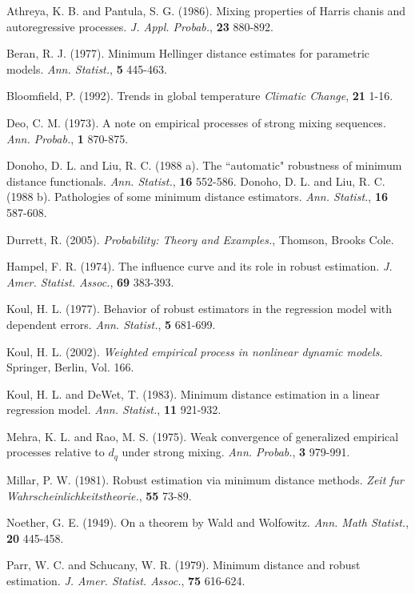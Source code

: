 \begin{thebibliography}{17}

\bibitem{} Athreya, K. B. and Pantula, S. G. (1986). Mixing properties of Harris chanis and autoregressive processes. \textit{J. Appl. Probab.}, \textbf{23} 880-892.

\bibitem{}  Beran, R. J. (1977). Minimum Hellinger distance estimates for parametric models. \textit{Ann. Statist.}, \textbf{5} 445-463.

\bibitem{}  Bloomfield, P. (1992). Trends in global temperature \textit{Climatic Change}, \textbf{21} 1-16.


\bibitem{} Deo, C. M. (1973). A note on empirical processes of strong mixing sequences. \textit{Ann. Probab.}, \textbf{1} 870-875.

\bibitem{} Donoho, D. L. and Liu, R. C. (1988 a). The ``automatic" robustness of minimum distance functionals. \textit{Ann. Statist.}, \textbf{16} 552-586.
\bibitem{} Donoho, D. L. and Liu, R. C. (1988 b). Pathologies of some minimum distance estimators. \textit{Ann. Statist.}, \textbf{16} 587-608.

\bibitem{} Durrett, R. (2005). \textit{Probability: Theory and Examples.}, Thomson, Brooks Cole.


\bibitem{} Hampel, F. R. (1974). The influence curve and its role in robust estimation. \textit{J. Amer. Statist. Assoc.}, \textbf{69} 383-393.


\bibitem{} Koul, H. L. (1977). Behavior of robust estimators in the regression model with dependent errors. \textit{Ann. Statist.}, \textbf{5} 681-699.

\bibitem{} Koul, H. L. (2002). \textit{Weighted empirical process in nonlinear dynamic models.} Springer, Berlin, Vol. 166.


\bibitem{} Koul, H. L. and DeWet, T. (1983). Minimum distance estimation in a linear regression model. \textit{Ann. Statist.}, \textbf{11} 921-932.

\bibitem{} Mehra, K. L. and Rao, M. S. (1975). Weak convergence of generalized empirical processes relative to $d_{q}$ under strong mixing. \textit{Ann. Probab.}, \textbf{3} 979-991.

\bibitem{} Millar, P. W. (1981). Robust estimation via minimum distance methods. \textit{Zeit fur Wahrscheinlichkeitstheorie.}, \textbf{55} 73-89.

\bibitem{} Noether, G. E. (1949). On a theorem by Wald and Wolfowitz. \textit{Ann. Math Statist.}, \textbf{20} 445-458.


\bibitem{}  Parr, W. C. and Schucany, W. R. (1979). Minimum distance and robust estimation. \textit{J. Amer. Statist. Assoc.}, \textbf{75} 616-624.

\end{thebibliography}















